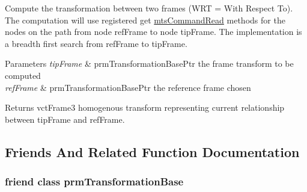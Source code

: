 Compute the transformation between two frames (W\-R\-T = With Respect To). The computation will use registered get \hyperlink{classmts_command_read}{mts\-Command\-Read} methods for the nodes on the path from node ref\-Frame to node tip\-Frame. The implementation is a breadth first search from ref\-Frame to tip\-Frame. 
\begin{DoxyParams}{Parameters}
{\em tip\-Frame} & prm\-Transformation\-Base\-Ptr the frame transform to be computed \\
\hline
{\em ref\-Frame} & prm\-Transformation\-Base\-Ptr the reference frame chosen \\
\hline
\end{DoxyParams}
\begin{DoxyReturn}{Returns}
vct\-Frame3 homogenous transform representing current relationship between tip\-Frame and ref\-Frame. 
\end{DoxyReturn}


\subsection{Friends And Related Function Documentation}
\hypertarget{classprm_transformation_manager_a1414bde07bd6dda93937227241d8b7ee}{
\subsubsection[{prm\-Transformation\-Base}]{\setlength{\rightskip}{0pt plus 5cm}friend class {\bf prm\-Transformation\-Base}\hspace{0.3cm}{\ttfamily [friend]}}}\label{classprm_transformation_manager_a1414bde07bd6dda93937227241d8b7ee}


